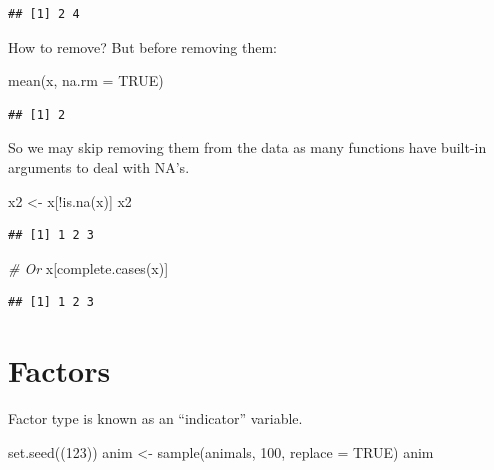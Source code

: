 \documentclass[
]{book}
\newenvironment{Shaded}{\begin{snugshade}}{\end{snugshade}}
\newcommand{\AttributeTok}[1]{\textcolor[rgb]{0.77,0.63,0.00}{#1}}
\newcommand{\CommentTok}[1]{\textcolor[rgb]{0.56,0.35,0.01}{\textit{#1}}}
\newcommand{\ConstantTok}[1]{\textcolor[rgb]{0.00,0.00,0.00}{#1}}
\newcommand{\DecValTok}[1]{\textcolor[rgb]{0.00,0.00,0.81}{#1}}
\newcommand{\FunctionTok}[1]{\textcolor[rgb]{0.00,0.00,0.00}{#1}}
\newcommand{\NormalTok}[1]{#1}
\newcommand{\OtherTok}[1]{\textcolor[rgb]{0.56,0.35,0.01}{#1}}
\newcommand{\SpecialCharTok}[1]{\textcolor[rgb]{0.00,0.00,0.00}{#1}}
\begin{document}
\begin{verbatim}
## [1] 2 4
\end{verbatim}

How to remove? But before removing them:

\begin{Shaded}
\begin{Highlighting}[]
\FunctionTok{mean}\NormalTok{(x, }\AttributeTok{na.rm =} \ConstantTok{TRUE}\NormalTok{)}
\end{Highlighting}
\end{Shaded}

\begin{verbatim}
## [1] 2
\end{verbatim}

So we may skip removing them from the data as many functions have built-in arguments to deal with NA's.

\begin{Shaded}
\begin{Highlighting}[]
\NormalTok{x2 }\OtherTok{\textless{}{-}}\NormalTok{ x[}\SpecialCharTok{!}\FunctionTok{is.na}\NormalTok{(x)]}
\NormalTok{x2}
\end{Highlighting}
\end{Shaded}

\begin{verbatim}
## [1] 1 2 3
\end{verbatim}

\begin{Shaded}
\begin{Highlighting}[]
\CommentTok{\# Or}
\NormalTok{x[}\FunctionTok{complete.cases}\NormalTok{(x)]}
\end{Highlighting}
\end{Shaded}

\begin{verbatim}
## [1] 1 2 3
\end{verbatim}

\hypertarget{factors}{%
\section{Factors}\label{factors}}

Factor type is known as an ``indicator'' variable.

\begin{Shaded}
\begin{Highlighting}[]
\FunctionTok{set.seed}\NormalTok{((}\DecValTok{123}\NormalTok{))}
\NormalTok{anim }\OtherTok{\textless{}{-}} \FunctionTok{sample}\NormalTok{(animals, }\DecValTok{100}\NormalTok{, }\AttributeTok{replace =} \ConstantTok{TRUE}\NormalTok{)}
\NormalTok{anim}
\end{Highlighting}
\end{Shaded}
\end{document}
